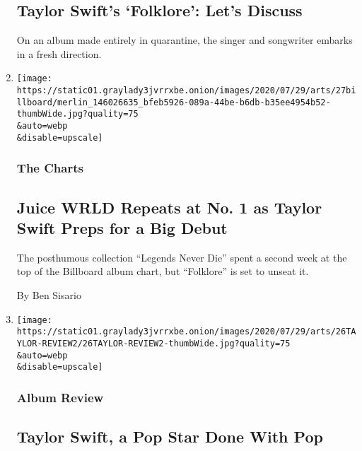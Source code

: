\begin{enumerate}
{  \subsection{Taylor Swift's `Folklore': Let's
  Discuss}\label{taylor-swifts-folklore-lets-discuss}}

  On an album made entirely in quarantine, the singer and songwriter
  embarks in a fresh direction.
\item
  \href{/2020/07/27/arts/music/juice-wrld-taylor-swift-billboard.html}{}

  \texttt{[image: https://static01.graylady3jvrrxbe.onion/images/2020/07/29/arts/27billboard/merlin\_146026635\_bfeb5926-089a-44be-b6db-b35ee4954b52-thumbWide.jpg?quality=75\\\&auto=webp\\\&disable=upscale]}

  \hypertarget{the-charts-3}{%
  \subsubsection{The Charts}\label{the-charts-3}}

  \hypertarget{juice-wrld-repeats-at-no-1-as-taylor-swift-preps-for-a-big-debut}{%
  \subsection{Juice WRLD Repeats at No. 1 as Taylor Swift Preps for a
  Big
  Debut}\label{juice-wrld-repeats-at-no-1-as-taylor-swift-preps-for-a-big-debut}}

  The posthumous collection ``Legends Never Die'' spent a second week at
  the top of the Billboard album chart, but ``Folklore'' is set to
  unseat it.

  By Ben Sisario
\item
  \href{/2020/07/26/arts/music/taylor-swift-folklore-review.html}{}

  \texttt{[image: https://static01.graylady3jvrrxbe.onion/images/2020/07/29/arts/26TAYLOR-REVIEW2/26TAYLOR-REVIEW2-thumbWide.jpg?quality=75\\\&auto=webp\\\&disable=upscale]}

  \hypertarget{album-review}{%
  \subsubsection{Album Review}\label{album-review}}

  \hypertarget{taylor-swift-a-pop-star-done-with-pop}{%
  \subsection{Taylor Swift, a Pop Star Done With
  Pop}\label{taylor-swift-a-pop-star-done-with-pop}}


\end{enumerate}
